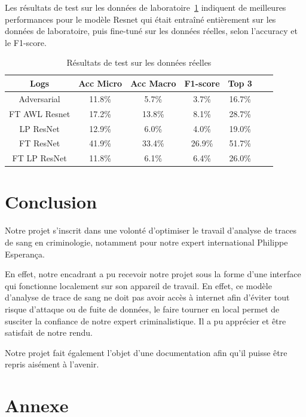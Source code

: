 \documentclass[a4paper]{article}
\begin{document}
Les résultats de test sur les données de laboratoire~\ref{tab:results_real} indiquent de meilleures performances pour le modèle Resnet qui était entraîné entièrement sur les données de laboratoire, puis fine-tuné sur les données réelles, selon l'accuracy et le F1-score. 

\begin{table}[H]
  \centering
  \caption{Résultats de test sur les données réelles}
    \begin{tabular}{|c|c|c|c|c|c|c|}
    \toprule
    Logs & Acc Micro & Acc Macro & F1-score & Top 3 \\
    \midrule
    Adversarial & 11.8\% & 5.7\% & 3.7\% & 16.7\% \\
    FT AWL Resnet & 17.2\% & 13.8\% & 8.1\% & 28.7\% \\
    LP ResNet & 12.9\% & 6.0\% & 4.0\% & 19.0\% \\
    FT ResNet & 41.9\% & 33.4\% & 26.9\% & 51.7\% \\
    FT LP ResNet & 11.8\% & 6.1\% & 6.4\% & 26.0\% \\
    \bottomrule
    \end{tabular}
  \label{tab:results_real}
\end{table}

\section{Conclusion}

Notre projet s'inscrit dans une volonté d'optimiser le travail d'analyse de traces de sang en criminologie, notamment pour notre expert international Philippe Esperança. 

En effet, notre encadrant a pu recevoir notre projet sous la forme d'une interface qui fonctionne localement sur son appareil de travail. En effet, ce modèle d'analyse de trace de sang ne doit pas avoir accès à internet afin d'éviter tout risque d'attaque ou de fuite de données, le faire tourner en local permet de susciter la confiance de notre expert criminalistique. Il a pu apprécier et être satisfait de notre rendu.

Notre projet fait également l'objet d'une documentation afin qu'il puisse être repris aisément à l'avenir. 

\printbibliography

\section{Annexe}
\end{document}
